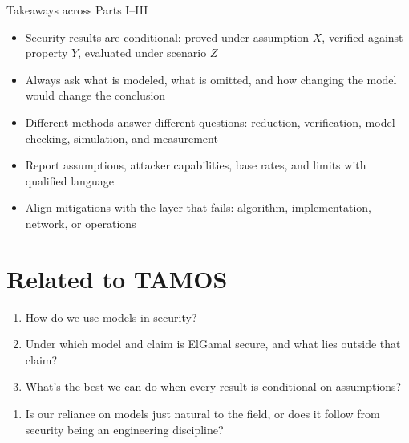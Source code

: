 \begin{frame}
  \begin{block}{Takeaways across Parts I--III}
    \begin{itemize}
      \item Security results are conditional: proved under assumption $X$, 
        verified against property $Y$, evaluated under scenario $Z$
      \item Always ask what is modeled, what is omitted, and how changing the 
        model would change the conclusion
      \item Different methods answer different questions: reduction, 
        verification, model checking, simulation, and measurement
      \item Report assumptions, attacker capabilities, base rates, and limits 
        with qualified language
      \item Align mitigations with the layer that fails: algorithm, 
        implementation, network, or operations
    \end{itemize}
  \end{block}
\end{frame}


\section{Related to TAMOS}

\begin{frame}
  \begin{question}[Models]
    \begin{enumerate}
      \item How do we use models in security?
      \item Under which model and claim is ElGamal secure, and what lies 
        outside that claim?
      \item What's the best we can do when every result is conditional on 
        assumptions?
    \end{enumerate}
  \end{question}
\end{frame}

\begin{frame}
  \begin{question}
    \begin{enumerate}
      \item Is our reliance on models just natural to the field, or does it 
        follow from security being an engineering discipline?
    \end{enumerate}
  \end{question}
\end{frame}

